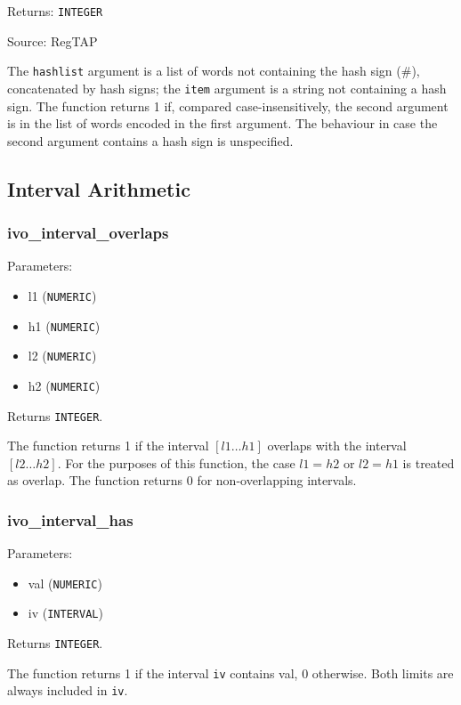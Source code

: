 \documentclass[11pt,a4paper]{ivoa}
\begin{document}
Returns: \texttt{INTEGER}

Source: RegTAP \citep{2014ivoa.spec.1208D}

The \texttt{hashlist} argument is a list of words not containing the hash
sign (\#), concatenated by hash signs; the \texttt{item} argument is
a string not containing a hash sign. The function
returns 1 if, compared case-insensitively,
the second argument is in the list of words encoded in the first argument.
The behaviour in case the second argument contains a hash sign is
unspecified.

\subsection{Interval Arithmetic}

\subsubsection{ivo\_interval\_overlaps}

Parameters:

\begin{itemize}
	\item l1 (\texttt{NUMERIC})
	\item h1 (\texttt{NUMERIC})
	\item l2 (\texttt{NUMERIC})
	\item h2 (\texttt{NUMERIC})
\end{itemize}

Returns \texttt{INTEGER}.

The function returns 1 if the interval $[l1\ldots h1]$ overlaps with the
interval $[l2\ldots h2]$. For the purposes of this function, the case
$l1=h2$ or
$l2=h1$ is treated as overlap. The function returns 0 for non-overlapping
intervals.

\subsubsection{ivo\_interval\_has}

Parameters:

\begin{itemize}
	\item val (\texttt{NUMERIC})
	\item iv (\texttt{INTERVAL})
\end{itemize}

Returns \texttt{INTEGER}.

The function returns 1 if the interval \texttt{iv} contains val, 0
otherwise. Both  limits are always included in \texttt{iv}.
\end{document}
